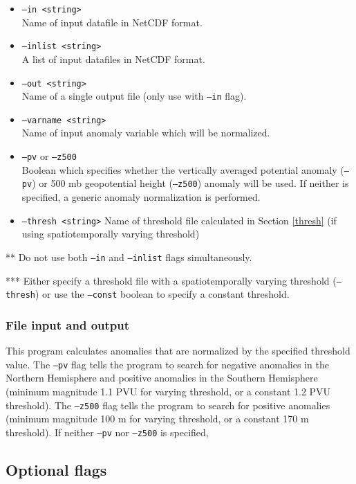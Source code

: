\documentclass{article}
\begin{document}
\begin{itemize}
\item[]\texttt{--in <string>}\\ Name of input datafile in NetCDF format.
\item[]\texttt{--inlist <string>} \\ A list of input datafiles in NetCDF format. 
\item[] \texttt{--out <string>} \\ Name of a single output file (only use with \texttt{--in} flag).
\item[] \texttt{--varname <string>}\\Name of input anomaly variable which will be normalized.
\item[]\texttt{--pv} or \texttt{--z500}\\Boolean which specifies whether the vertically averaged potential anomaly (\texttt{--pv}) or 500 mb geopotential height (\texttt{--z500}) anomaly will be used. If neither is specified, a generic anomaly normalization is performed.
\item[]\texttt{--thresh <string>} Name of threshold file calculated in Section \ref{thresh} (if using spatiotemporally varying threshold)
\end{itemize}


** Do not use both \texttt{--in} and \texttt{--inlist} flags simultaneously.

*** Either specify a threshold file with a spatiotemporally varying threshold (\texttt{--thresh}) or use the \texttt{--const} boolean to specify a constant threshold.

\subsubsection{File input and output}
This program calculates anomalies that are normalized by the specified threshold value. The \texttt{--pv} flag tells the program to search for negative anomalies in the Northern Hemisphere and positive anomalies in the Southern Hemisphere (minimum magnitude 1.1 PVU for varying threshold, or a constant 1.2 PVU threshold). The \texttt{--z500} flag tells the program to search for positive anomalies (minimum magnitude 100 m for varying threshold, or a constant 170 m threshold). If neither \texttt{--pv} nor \texttt{--z500} is specified, 

\subsection{Optional flags}\label{option}
\end{document}
